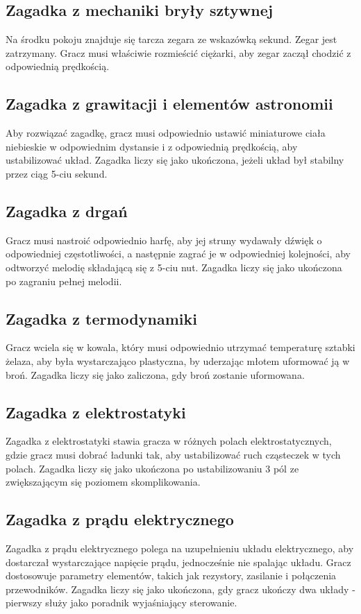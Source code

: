 \subsection{Zagadka z mechaniki bryły sztywnej}
Na środku pokoju znajduje się tarcza zegara ze wskazówką sekund. Zegar jest zatrzymany. Gracz musi właściwie rozmieścić ciężarki, aby zegar zaczął chodzić z odpowiednią prędkością.

\subsection{Zagadka z grawitacji i elementów astronomii}
Aby rozwiązać zagadkę, gracz musi odpowiednio ustawić miniaturowe ciała niebieskie w odpowiednim dystansie i z odpowiednią prędkością, aby ustabilizować układ. Zagadka liczy się jako ukończona, jeżeli układ był stabilny przez ciąg 5-ciu sekund.

\subsection{Zagadka z drgań}
Gracz musi nastroić odpowiednio harfę, aby jej struny wydawały dźwięk o odpowiedniej częstotliwości, a następnie zagrać je w odpowiedniej kolejności, aby odtworzyć melodię składającą się z 5-ciu nut. Zagadka liczy się jako ukończona po zagraniu pełnej melodii.

\subsection{Zagadka z termodynamiki}
Gracz wciela się w kowala, który musi odpowiednio utrzymać temperaturę sztabki żelaza, aby była wystarczająco plastyczna, by uderzając młotem uformować ją w broń. Zagadka liczy się jako zaliczona, gdy broń zostanie uformowana.

\subsection{Zagadka z elektrostatyki}
Zagadka z elektrostatyki stawia gracza w różnych polach elektrostatycznych, gdzie gracz musi dobrać ładunki tak, aby ustabilizować ruch cząsteczek w tych polach. Zagadka liczy się jako ukończona po ustabilizowaniu 3 pól ze zwiększającym się poziomem skomplikowania.

\subsection{Zagadka z prądu elektrycznego}
Zagadka z prądu elektrycznego polega na uzupełnieniu układu elektrycznego, aby dostarczał wystarczające napięcie prądu, jednocześnie nie spalając układu. Gracz dostosowuje parametry elementów, takich jak rezystory, zasilanie i połączenia przewodników. Zagadka liczy się jako ukończona, gdy gracz ukończy dwa układy - pierwszy służy jako poradnik wyjaśniający sterowanie.

